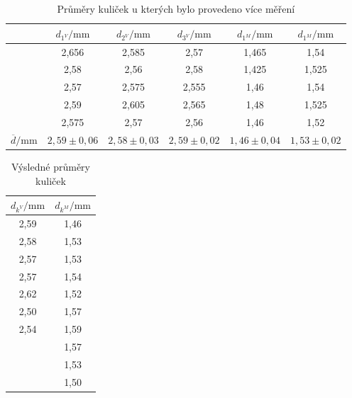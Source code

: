 \documentclass[a4paper,12pt]{article}
\begin{document}
\begin{table}[!htb]
	\label{prumery_malo}
     \caption[]{Průměry kuliček u kterých bylo provedeno více měření} 
   \begin{center}
    \begin{tabular}{|c|c|c|c|c|c|}
        \hline
	&	$d_{1^V} /\mathrm{mm}$&	$d_{2^V} /\mathrm{mm}$	&	$d_{3^V} /\mathrm{mm}$	&	$d_{1^M} /\mathrm{mm}$	&	$d_{1^M} /\mathrm{mm}$ \\
\hline \hline										
	&	2,656	&	2,585	&	2,57	&	1,465	&	1,54 \\ \cline{2-6}
										
	&	2,58	&	2,56	&	2,58	&	1,425	&	1,525\\ \cline{2-6}
									
	&	2,57	&	2,575	&	2,555	&	1,46	&	1,54\\ \cline{2-6}
										
	&	2,59	&	2,605	&	2,565	&	1,48	&	1,525\\ \cline{2-6}
										
	&	2,575	&	2,57	&	2,56	&	1,46	&	1,52\\
\hline	\hline									
$\overline{d} /\mathrm{mm}$	&	$2,59 \pm 0,06$	&	$2,58 \pm 0,03$	&	$2,59 \pm 0,02$	&	$1,46 \pm 0,04$	&	$1,53 \pm 0,02$\\
\hline																					
    \end{tabular}
     \end{center}
  \end{table}
  
\begin{table}[!htb]
	\label{prumery}
     \caption[]{Výsledné průměry kuliček} 
   \begin{center}
    \begin{tabular}{|c|c|}
        \hline
$d_{k^V} /\mathrm{mm}$	&	$d_{k^M} /\mathrm{mm}$\\
\hline		\hline
2,59	&	1,46\\
\hline		
2,58	&	1,53\\
\hline		
2,57	&	1,53\\
\hline		
2,57	&	1,54\\
\hline		
2,62	&	1,52\\
\hline		
2,50	&	1,57\\
\hline		
2,54	&	1,59\\
\hline		
	&	1,57\\
\hline		
	&	1,53\\
\hline		
	&	1,50\\
	\hline
    \end{tabular}
     \end{center}
  \end{table}
  
\end{document}
